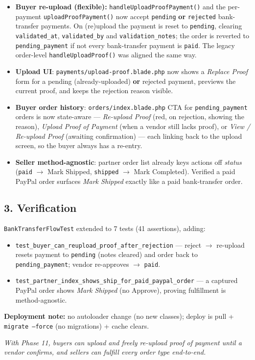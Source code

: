 \documentclass[12pt,a4paper]{article}
\begin{document}
\begin{itemize}
    \item \textbf{Buyer re-upload (flexible):} \texttt{handleUploadProofPayment()} and the per-payment
    \texttt{uploadProofPayment()} now accept \texttt{pending} \textbf{or} \texttt{rejected} bank-transfer
    payments. On (re)upload the payment is reset to \texttt{pending}, clearing \texttt{validated\_at},
    \texttt{validated\_by} and \texttt{validation\_notes}; the order is reverted to \texttt{pending\_payment}
    if not every bank-transfer payment is \texttt{paid}. The legacy order-level \texttt{handleUploadProof()}
    was aligned the same way.
    \item \textbf{Upload UI}: \texttt{payments/upload-proof.blade.php} now shows a \emph{Replace Proof} form
    for a pending (already-uploaded) \textbf{or} rejected payment, previews the current proof, and keeps the
    rejection reason visible.
    \item \textbf{Buyer order history}: \texttt{orders/index.blade.php} CTA for \texttt{pending\_payment}
    orders is now state-aware — \emph{Re-upload Proof} (red, on rejection, showing the reason),
    \emph{Upload Proof of Payment} (when a vendor still lacks proof), or \emph{View / Re-upload Proof}
    (awaiting confirmation) — each linking back to the upload screen, so the buyer always has a re-entry.
    \item \textbf{Seller method-agnostic}: partner order list already keys actions off \emph{status}
    (\texttt{paid} $\rightarrow$ Mark Shipped, \texttt{shipped} $\rightarrow$ Mark Completed). Verified a
    paid PayPal order surfaces \emph{Mark Shipped} exactly like a paid bank-transfer order.
\end{itemize}

\subsection{3. Verification}

\texttt{BankTransferFlowTest} extended to 7 tests (41 assertions), adding:
\begin{itemize}
    \item \texttt{test\_buyer\_can\_reupload\_proof\_after\_rejection} — reject $\rightarrow$ re-upload resets
    payment to \texttt{pending} (notes cleared) and order back to \texttt{pending\_payment}; vendor
    re-approves $\rightarrow$ \texttt{paid}.
    \item \texttt{test\_partner\_index\_shows\_ship\_for\_paid\_paypal\_order} — a captured PayPal order shows
    \emph{Mark Shipped} (no Approve), proving fulfillment is method-agnostic.
\end{itemize}

\textbf{Deployment note:} no autoloader change (no new classes); deploy is pull + \texttt{migrate --force}
(no migrations) + cache clears.

\vfill
\begin{center}
    \textit{With Phase 11, buyers can upload and freely re-upload proof of payment until a vendor confirms, and sellers can fulfill every order type end-to-end.}
\end{center}
\end{document}
